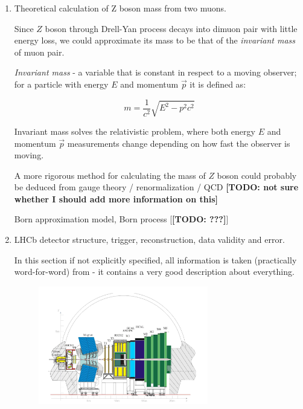 \documentclass[11pt,a4paper,twoside]{article}
\begin{document}
\begin{enumerate}
        \item Theoretical calculation of Z boson mass from two muons.


        Since $Z$ boson through Drell-Yan process decays into dimuon pair with little energy loss, we could approximate its mass to be that of the \textit{invariant mass} of muon pair.

        \textit{Invariant mass} - a variable that is constant in respect to a moving observer; for a particle with energy $E$ and momentum $\vec{p}$ it is defined as:

        \begin{equation}
            m = \frac{1}{c^2} \sqrt{E^2 - p^2c^2}
            \label{eq:001-invariant-mass}
        \end{equation}

        Invariant mass solves the relativistic problem, where both energy $E$ and momentum $\vec{p}$ measurements change depending on how fast the observer is moving. 

        A more rigorous method for calculating the mass of $Z$ boson could probably be deduced from gauge theory / renormalization / QCD \textbf{[TODO: not sure whether I should add more information on this]}

        Born approximation model, Born process [\textbf{[TODO: ???]}] \cite{khodaverdian2019accuracy}

        

        \item LHCb detector structure, trigger, reconstruction, data validity and error.

        In this section if not explicitly specified, all information is taken (practically word-for-word) from \cite{Bursche:2014ltl} - it contains a very good description about everything.

        \begin{figure}[H]
            \centering

            \includegraphics[width=0.7\textwidth]{visuals/005-LHCb-detector.png}
            

\end{figure}
\end{enumerate}
\end{document}
